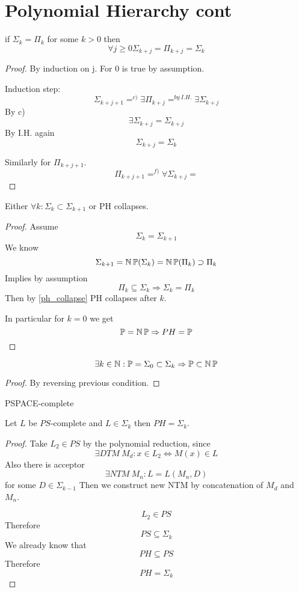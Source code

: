 \section{\texorpdfstring{Polynomial Hierarchy cont}{Polynomial Hierarchy cont}}
\vspace{5mm}
\large

\begin{consequence}\label{ph_collapse}
	if $\Sigma_k = \Pi_k$ for some $k > 0$ then
	\[ \forall j \geq 0 \Sigma_{k + j} = \Pi_{k + j} = \Sigma_k \]
\end{consequence}
\begin{proof}
	By induction on j. For 0 is true by assumption.

	Induction step:
	\[ \Sigma_{k + j + 1} =^{c)} \exists \Pi_{k + j} =^{by\ I.H.} \exists \Sigma_{k + j} \]
	By c)
	\[ \exists \Sigma_{k + j} = \Sigma_{k + j} \]
	By I.H. again
	\[ \Sigma_{k + j} = \Sigma_k \]

	Similarly for $\Pi_{k + j + 1}$.
	\[ \Pi_{k + j + 1} =^{f)} \forall \Sigma_{k + j} = \]
\end{proof}

\begin{consequence}
	Either $\forall k: \Sigma_k \subset \Sigma_{k + 1}$ or PH collapses.
\end{consequence}
\begin{proof}
	Assume
	\[ \Sigma_k = \Sigma_{k + 1} \]
	We know
	\[ \Sigma_{k + 1} = \operatorname{\operatorname{\mathbb{N}}\mathbb{P}}(\Sigma_{k}) = \operatorname{\operatorname{\mathbb{N}}\mathbb{P}}(\Pi_k) \supset \Pi_k \]
	Implies by assumption
	\[ \Pi_k \subseteq \Sigma_k \Rightarrow \Sigma_k = \Pi_k \]
	Then by \cref{ph_collapse} PH collapses after $k$.

	In particular for $k = 0$ we get
	\[ \operatorname{\mathbb{P}} = \operatorname{\operatorname{\mathbb{N}}\mathbb{P}} \Rightarrow PH = \operatorname{\mathbb{P}} \]
\end{proof}

\begin{consequence}
	\[ \exists k \in \operatorname{\mathbb{N}}: \operatorname{\mathbb{P}} = \Sigma_0 \subset \Sigma_k \Rightarrow \operatorname{\mathbb{P}} \subset \operatorname{\operatorname{\mathbb{N}}\mathbb{P}} \]
\end{consequence}
\begin{proof}
	By reversing previous condition.
\end{proof}

\begin{definition}
	PSPACE-complete
\end{definition}

\begin{lemma}\label{ph_col_lemma}
	Let $L$ be $PS$-complete and $L \in \Sigma_k$ then $PH = \Sigma_k$.
\end{lemma}
\begin{proof}
	Take $L_2 \in PS$ by the polynomial reduction, since
	\[ \exists DTM\ M_d: x \in L_2 \iff M(x) \in L \]
	Also there is acceptor
	\[ \exists NTM\ M_n: L = L(M_n, D) \]
	for some $D \in \Sigma_{k - 1}$
	Then we construct new NTM by concatenation of $M_d$ and $M_n$.

	\[ L_2 \in PS \]
	Therefore
	\[ PS \subseteq \Sigma_k \]
	We already know that
	\[ PH \subseteq PS \]
	Therefore
	\[ PH = \Sigma_k \]
\end{proof}

